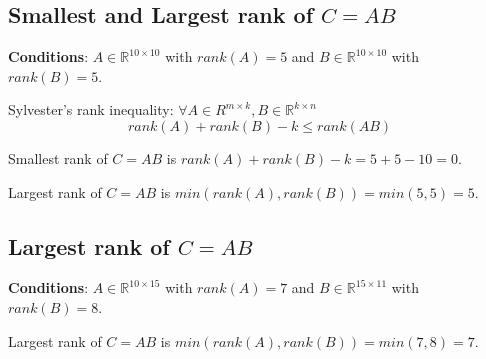 \documentclass[11pt,a4paper]{report}
\begin{document}
\subsection{Smallest and Largest rank of $C = AB$}

{\bf Conditions}: 
$A \in \mathbb{R}^{10 \times 10}$ with $rank(A) = 5$ and $B \in \mathbb{R}^{10 \times 10}$ with
$rank(B) = 5$. 

Sylvester's rank inequality: 
$\forall A \in R^{m\times k}, B \in \mathbb{R}^{k\times n}$
$$rank(A) + rank(B) - k \leq rank(AB)$$

Smallest rank of $C = AB$ is $rank(A) + rank(B) - k = 5 + 5 - 10 = 0$.

Largest rank of $C = AB$ is $min(rank(A), rank(B)) = min(5,5) = 5$.

\subsection{Largest rank of $C = AB$}
{\bf Conditions}: 
$A \in \mathbb{R}^{10 \times 15}$ with $rank(A) = 7$ and $B \in \mathbb{R}^{15 \times 11}$ with
$rank(B) = 8$. 

Largest rank of $C = AB$ is $min(rank(A), rank(B)) = min(7,8) = 7$.
\end{document}
